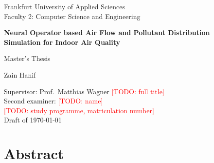 \documentclass[11pt,a4paper,oneside]{report}
\newcommand{\todo}[1]{\textcolor{red}{[TODO: #1]}}
\begin{document}
\begin{titlepage}
  \centering
  {\large Frankfurt University of Applied Sciences\\Faculty 2: Computer Science and Engineering\par}
  \vspace{3cm}
  {\LARGE\bfseries Neural Operator based Air Flow and Pollutant Distribution Simulation for Indoor Air Quality\par}
  \vspace{1.5cm}
  {\large Master's Thesis\par}
  \vspace{1cm}
  {\large Zain Hanif\par}
  \vfill
  {\large Supervisor: Prof.\ Matthias Wagner \todo{full title}\\
  Second examiner: \todo{name}\\[1em]
  \todo{study programme, matriculation number}\\
  Draft of \today\par}
\end{titlepage}

\chapter*{Abstract}


\tableofcontents












\appendix




\end{document}
